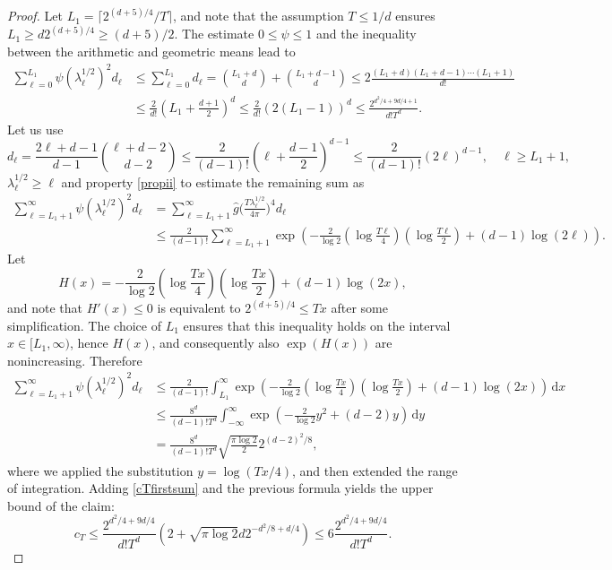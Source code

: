 \documentclass[11pt,a4paper]{article}
\theoremstyle{definition}
\begin{document}
\begin{proof}
Let $L_1 = \lceil 2^{(d+5)/4}/T \rceil$, and note that the assumption $T \le 1/d$ ensures $L_1 \ge d 2^{(d+5)/4} \ge (d+5)/2$. The estimate $0 \le \psi \le 1$ and the inequality between the arithmetic and geometric means lead to
\begin{equation}\label{cTfirstsum}
\begin{split} \sum_{\ell=0}^{L_1} \psi (\lambda_{\ell}^{1/2})^2 d_{\ell} &\le \sum_{\ell=0}^{L_1} d_{\ell} = \binom{L_1+d}{d} + \binom{L_1+d-1}{d} \le 2 \frac{(L_1+d) (L_1+d-1) \cdots (L_1+1)}{d!} \\ &\le \frac{2}{d!} \left( L_1 + \frac{d+1}{2} \right)^d \le \frac{2}{d!} (2(L_1-1))^d \le \frac{2^{d^2/4 + 9d/4+1}}{d! T^d} . \end{split}
\end{equation}
Let us use
\[ d_{\ell} = \frac{2\ell+d-1}{d-1} \binom{\ell+d-2}{d-2} \le \frac{2}{(d-1)!} \left( \ell + \frac{d-1}{2} \right)^{d-1} \le \frac{2}{(d-1)!}(2\ell)^{d-1}, \quad \ell \ge L_1+1, \]
$\lambda_{\ell}^{1/2} \ge \ell$ and property \eqref{propii} to estimate the remaining sum as
\[ \begin{split} \sum_{\ell=L_1+1}^{\infty} \psi(\lambda_{\ell}^{1/2})^2 d_{\ell} &= \sum_{\ell=L_1+1}^{\infty} \widehat{g} \bigg(\frac{T \lambda_{\ell}^{1/2}}{4 \pi} \bigg)^4 d_{\ell} \\ &\le \frac{2}{(d-1)!} \sum_{\ell=L_1+1}^{\infty} \exp \left( - \frac{2}{\log 2} \left( \log \frac{T \ell}{4} \right) \left( \log \frac{T \ell}{2} \right) + (d-1) \log (2 \ell) \right) . \end{split} \]
Let
\[ H(x) = - \frac{2}{\log 2} \left( \log \frac{Tx}{4} \right) \left( \log \frac{Tx}{2} \right) + (d-1) \log (2x) , \]
and note that $H'(x) \le 0$ is equivalent to $2^{(d+5)/4} \le Tx$ after some simplification. The choice of $L_1$ ensures that this inequality holds on the interval $x \in [L_1, \infty)$, hence $H(x)$, and consequently also $\exp (H(x))$ are nonincreasing. Therefore
\[ \begin{split} \sum_{\ell=L_1+1}^{\infty} \psi(\lambda_{\ell}^{1/2})^2 d_{\ell} &\le \frac{2}{(d-1)!} \int_{L_1}^{\infty} \exp \left( - \frac{2}{\log 2} \left( \log \frac{Tx}{4} \right) \left( \log \frac{Tx}{2} \right) + (d-1) \log (2x) \right) \, \mathrm{d}x \\ &\le \frac{8^d}{(d-1)! T^d} \int_{-\infty}^{\infty} \exp \left( - \frac{2}{\log 2} y^2 + (d-2) y \right) \, \mathrm{d}y \\ &= \frac{8^d}{(d-1)! T^d} \sqrt{\frac{\pi \log 2}{2}} 2^{(d-2)^2 /8}, \end{split} \]
where we applied the substitution $y=\log (Tx/4)$, and then extended the range of integration.
Adding \eqref{cTfirstsum} and the previous formula yields the upper bound of the claim:
\[ c_T \le \frac{2^{d^2/4+9d/4}}{d! T^d} \left( 2+\sqrt{\pi \log 2} d 2^{-d^2/8+d/4} \right) \le 6 \frac{2^{d^2/4+9d/4}}{d! T^d}. \]


\end{proof}
\end{document}
